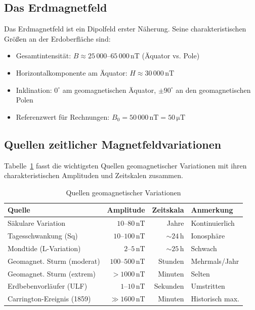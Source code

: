 ﻿\documentclass[a4paper,12pt]{article}
\theoremstyle{definition}
\begin{document}
\subsection{Das Erdmagnetfeld}

Das Erdmagnetfeld ist ein Dipolfeld erster N\"aherung. Seine charakteristischen
Gr\"o{\ss}en an der Erdoberfl\"ache sind:

\begin{itemize}
    \item Gesamtintensit\"at: $B \approx 25\,000$--$65\,000\,\mathrm{nT}$
          (\"Aquator vs. Pole)
    \item Horizontalkomponente am \"Aquator: $H \approx 30\,000\,\mathrm{nT}$
    \item Inklination: $0^{\circ}$ am geomagnetischen \"Aquator, $\pm 90^{\circ}$
          an den geomagnetischen Polen
    \item Referenzwert f\"ur Rechnungen: $B_0 = 50\,000\,\mathrm{nT} = 50\,\mathrm{\mu T}$
\end{itemize}

\subsection{Quellen zeitlicher Magnetfeldvariationen}

Tabelle~\ref{tab:quellen} fasst die wichtigsten Quellen geomagnetischer
Variationen mit ihren charakteristischen Amplituden und Zeitskalen zusammen.

\begin{table}[h!]
\centering
\caption{Quellen geomagnetischer Variationen}
\label{tab:quellen}
\begin{tabular}{lrrl}
\toprule
\textbf{Quelle} & \textbf{Amplitude} & \textbf{Zeitskala} & \textbf{Anmerkung} \\
\midrule
S\"akulare Variation      & $10$--$80\,\mathrm{nT}$   & Jahre          & Kontinuierlich \\
Tagesschwankung (Sq)      & $10$--$100\,\mathrm{nT}$  & $\sim 24\,\mathrm{h}$  & Ionosph\"are \\
Mondtide (L-Variation)    & $2$--$5\,\mathrm{nT}$     & $\sim 25\,\mathrm{h}$  & Schwach \\
Geomagnet. Sturm (moderat)& $100$--$500\,\mathrm{nT}$ & Stunden        & Mehrmals/Jahr \\
Geomagnet. Sturm (extrem) & $>1000\,\mathrm{nT}$      & Minuten        & Selten \\
Erdbebenvorläufer (ULF)   & $1$--$10\,\mathrm{nT}$    & Sekunden       & Umstritten \\
Carrington-Ereignis (1859)& $\gg 1600\,\mathrm{nT}$  & Minuten        & Historisch max. \\
\bottomrule
\end{tabular}
\end{table}
\end{document}
